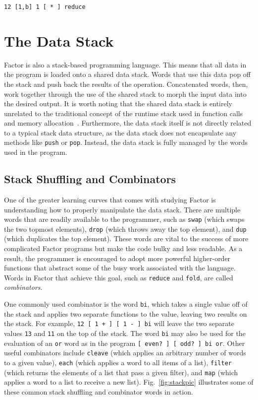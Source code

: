 \documentclass[sigconf]{acmart}
\begin{document}
\begin{lstlisting}
12 [1,b] 1 [ * ] reduce
\end{lstlisting}

\section{The Data Stack}
Factor is also a stack-based programming language. This means that
all data in the program is loaded onto a shared data stack. Words
that use this data pop off the stack and push back the results of
the operation. Concatenated words, then, work together through the
use of the shared stack to morph the input data into the
desired output. It is worth noting that the shared data stack is 
entirely unrelated to the traditional concept of the runtime stack
used in function calls and memory allocation~\cite{concatwiki}. 
Furthermore, the data stack itself is not directly related to a 
typical stack  data structure, as the data stack does not 
encapsulate any methods like \texttt{push} or \texttt{pop}. Instead,
the data stack is fully managed by the words used in the program.

\subsection{Stack Shuffling and Combinators}
One of the greater learning curves that comes with studying Factor
is understanding how to properly manipulate the data stack. There are
multiple words that are readily available to the programmer, such as 
\texttt{swap} (which swaps the two topmost elements), 
\texttt{drop} (which throws away the top element), and 
\texttt{dup} (which duplicates the top element). These words are 
vital to the success of more complicated Factor programs but make
the code bulky and less readable. As a result, the programmer is
encouraged to adopt more powerful higher-order functions
that abstract some of the busy work associated with the language.
Words in Factor that achieve this goal, such as \texttt{reduce} and
\texttt{fold}, are called \textit{combinators}.

One commonly used combinator is the word \texttt{bi}, which takes a
single value off of the stack and applies two separate functions to
the value, leaving two results on the stack. For example, 
\texttt{12 [ 1 + ] [ 1 - ] bi} will leave the two separate values
\texttt{13} and \texttt{11} on the top of the stack. The word
\texttt{bi} may also be used for the evaluation of an \texttt{or} 
word as in the program \texttt{[ even? ] [ odd? ] bi or}. Other 
useful combinators include \texttt{cleave} (which applies an 
arbitrary number of words to a given value), \texttt{each} (which 
applies a word to all items of a list), \texttt{filter} (which 
returns the elements of a list that pass a given filter), and 
\texttt{map} (which applies a word to a list to receive a new list). 
Fig.~\ref{fig:stackpic} illustrates some of these common stack 
shuffling and combinator words in action.
\end{document}
